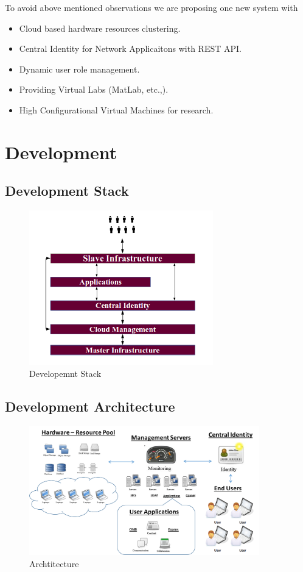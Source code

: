 \documentclass[12pt]{report}
\begin{document}
	To avoid above mentioned observations we are proposing one new system with 
	\begin{itemize}
		\item Cloud based hardware resources clustering.
		\item Central Identity for Network Applicaitons with REST API.
		\item Dynamic user role management.
		\item Providing Virtual Labs (MatLab, etc.,).
		\item High Configurational Virtual Machines for research.
	\end{itemize}

\chapter{Development}

\section{Development Stack}
\begin{figure}[H]
 \centering
 \includegraphics[width=8cm]{./idea.png}
 \caption{Developemnt Stack\label{fig:Developemnt Stack}}
\end{figure}

\section{Development Architecture}
\begin{figure}[H]
 \centering
 \includegraphics[width=10cm]{./all.png}
 \caption{Archtitecture\label{fig:Archtitecture}}
\end{figure}
\end{document}
